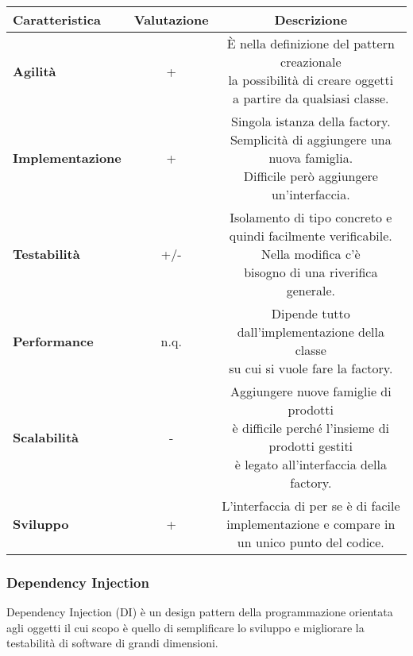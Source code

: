 {{{\begin{itemize}
				\small %
				{\renewcommand\arraystretch{1.2} %
					\begin{tabular}{|l|c|c|}
						\hline
						{\textbf{Caratteristica}}&{\textbf{Valutazione}}&{\textbf{Descrizione}}\\
						\hline
						\textbf{Agilità} & + &  \minitab[c]{È nella definizione del pattern creazionale\\la possibilità di creare oggetti\\a partire da qualsiasi classe.} \\
						\hline
						\textbf{Implementazione} & + &  \minitab[c]{Singola istanza della factory.\\Semplicità di aggiungere una nuova famiglia.\\Difficile però aggiungere un'interfaccia.} \\
						\hline
						\textbf{Testabilità} & +/- &  \minitab[c]{Isolamento di tipo concreto e quindi facilmente verificabile.\\ Nella modifica c'è\\bisogno di una riverifica generale.} \\
						\hline
						\textbf{Performance} & n.q. &  \minitab[c]{Dipende tutto dall'implementazione della classe\\su cui si vuole fare la factory.} \\
						\hline
						\textbf{Scalabilità} & - &  \minitab[c]{Aggiungere nuove famiglie di prodotti\\è difficile perché l’insieme di prodotti gestiti\\è legato all'interfaccia della factory.}\\
						\hline
						\textbf{Sviluppo} & + &  \minitab[c]{L'interfaccia di per se è di facile\\implementazione e compare in un unico punto del codice.} \\
						\hline
					\end{tabular}
				}
			\end{itemize}
		}
	
		\subsubsection{Dependency Injection}{
			Dependency Injection (DI) è un design pattern della programmazione orientata agli oggetti il cui scopo è quello di semplificare lo sviluppo e migliorare la testabilità di software di grandi dimensioni.
			
}}}
